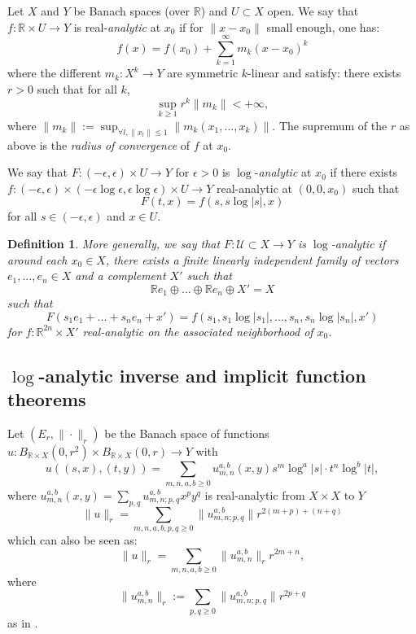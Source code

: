 \documentclass[12pt]{article}
\newtheorem{defn}[thm]{Definition}
\begin{document}
    Let $X$ and $Y$ be Banach spaces (over $\mathbb{R}$) and $U\subset X$ open. We say that $f: \mathbb{R}\times U\to Y$ is real-\emph{analytic} at $x_0$ if for $\|x-x_0\|$ small enough, one has:
    $$ f(x) = f(x_0)+ \sum_{k=1}^\infty m_k(x-x_0)^k $$
    where the different $m_k: X^k\to Y$ are symmetric $k$-linear and satisfy: there exists $r>0$ such that for all $k$,
    $$ \sup_{k\geqslant 1} r^k\|m_k\| <+\infty, $$
    where $\|m_k\| := \sup_{\forall l,\|x_l\|\leqslant 1} \|m_k(x_1,...,x_k)\|$. The supremum of the $r$ as above is the \emph{radius of convergence} of $f$ at $x_0$.
    
    We say that $F : (-\epsilon,\epsilon)\times U \to Y$ for $\epsilon>0$ is $\log$-\emph{analytic} at $x_0$ if there exists $f: (-\epsilon,\epsilon)\times (-\epsilon\log \epsilon,\epsilon\log \epsilon) \times U \to Y$ real-analytic at $(0,0,x_0)$ such that
    $$F(t,x) = f(s,s\log |s|,x)$$ 
    for all $ s\in (-\epsilon,\epsilon) $ and $x\in U$. 
    
    
    \begin{defn}
    More generally, we say that $F:\mathcal{U}\subset X\to Y$ is $\log$-analytic if around each $x_0\in X$, there exists a finite linearly independent family of vectors $e_1,...,e_n\in X$ and a complement $X'$ such that $$\mathbb{R}e_1\oplus...\oplus \mathbb{R}e_n\oplus X'=X$$ such that 
    $$F(s_1e_1+...+s_ne_n+x') = f(s_1,s_1\log|s_1|,...,s_n,s_n\log|s_n|,x') $$
    for $f : \mathbb{R}^{2n}\times X'$ real-analytic on the associated neighborhood of $x_0$.
    \end{defn}
    
    
    \subsection{$\log$-analytic inverse and implicit function theorems}
    
    Let $(E_r,\|\cdot\|_r)$ be the Banach space of functions $u: B_{\mathbb{R}\times X}(0,r^2)\times B_{\mathbb{R}\times X}(0,r)\to Y$ with 
    $$ u\left((s,x),(t,y)\right) = \sum_{m,n,a,b\geqslant 0} u_{m,n}^{a,b}(x,y)s^m\log^a|s|\cdot t^n\log^b|t|, $$
    where $u_{m,n}^{a,b}(x,y) = \sum_{p,q} u_{m,n;p,q}^{a,b}x^py^q$ is real-analytic from $X\times X$ to $Y$
    $$\|u\|_r = \sum_{m,n,a,b,p,q\geqslant 0} \|u_{m,n;p,q}^{a,b}\|r^{2(m+p)+(n+q)}$$
    which can also be seen as:
    $$\|u\|_r = \sum_{m,n,a,b\geqslant 0} \|u_{m,n}^{a,b}\|_r r^{2m+n},$$
    where $$\|u_{m,n}^{a,b}\|_r:= \sum_{p,q\geqslant 0}\|u_{m,n;p,q}^{a,b}\|r^{2p+q}$$
    as in \cite{bt}.
    
\end{document}
